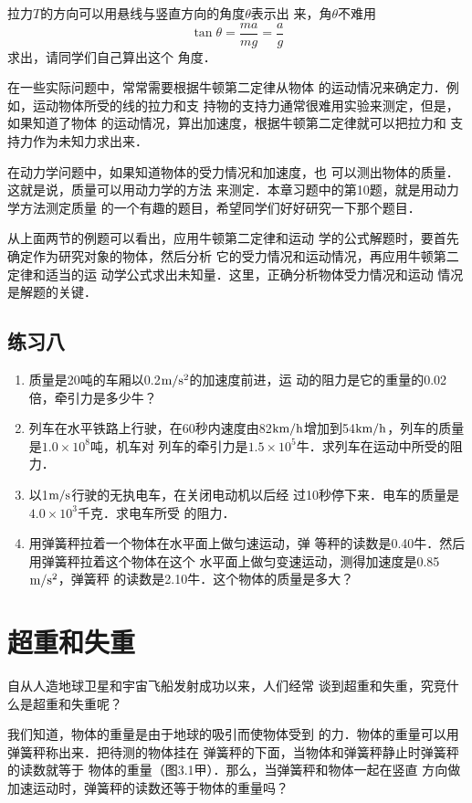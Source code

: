     拉力$T$的方向可以用悬线与竖直方向的角度$\theta$表示出
来，角$\theta$不难用\[\tan\theta =\frac{ma}{mg}=\frac{a}{g} \]
求出，请同学们自己算出这个
角度．

    在一些实际问题中，常常需要根据牛顿第二定律从物体
的运动情况来确定力．例如，运动物体所受的线的拉力和支
持物的支持力通常很难用实验来测定，但是，如果知道了物体
的运动情况，算出加速度，根据牛顿第二定律就可以把拉力和
支持力作为未知力求出来．

    在动力学问题中，如果知道物体的受力情况和加速度，也
可以测出物体的质量．这就是说，质量可以用动力学的方法
来测定．本章习题中的第10题，就是用动力学方法测定质量
的一个有趣的题目，希望同学们好好研究一下那个题目．

    从上面两节的例题可以看出，应用牛顿第二定律和运动
学的公式解题时，要首先确定作为研究对象的物体，然后分析
它的受力情况和运动情况，再应用牛顿第二定律和适当的运
动学公式求出未知量．这里，正确分析物体受力情况和运动
情况是解题的关键．

 \subsection*{练习八}
\begin{enumerate}
\item 质量是20吨的车厢以0.2$\text{m}/\text{s}^2$的加速度前进，运
动的阻力是它的重量的0.02倍，牵引力是多少牛？
\item  列车在水平铁路上行驶，在60秒内速度由82$\text{km}/\text{h}$增加到54$\text{km}/\text{h}$，列车的质量是$1.0\times 10^8$吨，机车对
列车的牵引力是$1.5\times 10^5$牛．求列车在运动中所受的阻力．
\item  以1$\text{m}/\text{s}$行驶的无执电车，在关闭电动机以后经
过10秒停下来．电车的质量是$4.0\times 10^3$千克．求电车所受
的阻力．
\item  用弹簧秤拉着一个物体在水平面上做匀速运动，弹
等秤的读数是0.40牛．然后用弹簧秤拉着这个物体在这个
水平面上做匀变速运动，测得加速度是0.85$\text{m}/\text{s}^2$，弹簧秤
的读数是2.10牛．这个物体的质量是多大？
\end{enumerate}

\section{超重和失重}
    自从人造地球卫星和宇宙飞船发射成功以来，人们经常
谈到超重和失重，究竞什么是超重和失重呢？

    我们知道，物体的重量是由于地球的吸引而使物体受到
的力．物体的重量可以用弹簧秤称出来．把待测的物体挂在
弹簧秤的下面，当物体和弹簧秤静止时弹簧秤的读数就等于
物体的重量（图3.1甲）．那么，当弹簧秤和物体一起在竖直
方向做加速运动时，弹簧秤的读数还等于物体的重量吗？

